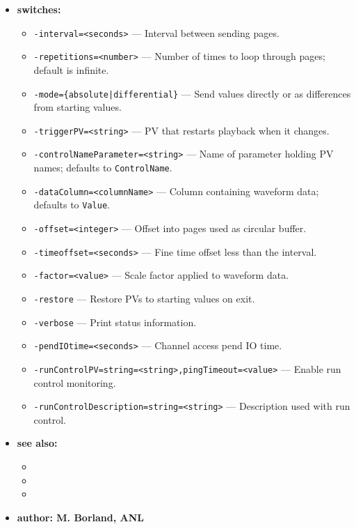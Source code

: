 \begin{itemize}
\item {\bf switches:}
  \begin{itemize}
  \item {\tt -interval=<seconds>} --- Interval between sending pages.
  \item {\tt -repetitions=<number>} --- Number of times to loop through pages; default is infinite.
  \item {\tt -mode=\{absolute|differential\}} --- Send values directly or as differences from starting values.
  \item {\tt -triggerPV=<string>} --- PV that restarts playback when it changes.
  \item {\tt -controlNameParameter=<string>} --- Name of parameter holding PV names; defaults to {\tt ControlName}.
  \item {\tt -dataColumn=<columnName>} --- Column containing waveform data; defaults to {\tt Value}.
  \item {\tt -offset=<integer>} --- Offset into pages used as circular buffer.
  \item {\tt -timeoffset=<seconds>} --- Fine time offset less than the interval.
  \item {\tt -factor=<value>} --- Scale factor applied to waveform data.
  \item {\tt -restore} --- Restore PVs to starting values on exit.
  \item {\tt -verbose} --- Print status information.
  \item {\tt -pendIOtime=<seconds>} --- Channel access pend IO time.
  \item {\tt -runControlPV=string=<string>,pingTimeout=<value>} --- Enable run control monitoring.
  \item {\tt -runControlDescription=string=<string>} --- Description used with run control.
  \end{itemize}

\item {\bf see also:}
  \begin{itemize}
  \item {}
  \item {}
  \item {}
  \end{itemize}

\item {\bf author: M. Borland, ANL}
\end{itemize}

